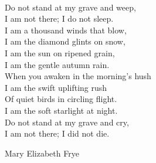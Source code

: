 \newpage
~
\vfill
\begin{english}
   \hspace*{0.5em} Do not stand at my grave and weep,
\\ \hspace*{2em} I am not there; I do not sleep.
\\ \hspace*{2em} I am a thousand winds that blow,
\\ \hspace*{2em} I am the diamond glints on snow,
\\ \hspace*{2em} I am the sun on ripened grain,
\\ \hspace*{2em} I am the gentle autumn rain.
\\ \hspace*{2em} When you awaken in the morning’s hush
\\ \hspace*{2em} I am the swift uplifting rush
\\ \hspace*{2em} Of quiet birds in circling flight.
\\ \hspace*{2em} I am the soft starlight at night.
\\ \hspace*{2em} Do not stand at my grave and cry,
\\ \hspace*{2em} I am not there; I did not die. 
\\ \begin{flushright}Mary Elizabeth Frye\end{flushright}
\end{english}
\vfill
~
\newpage
